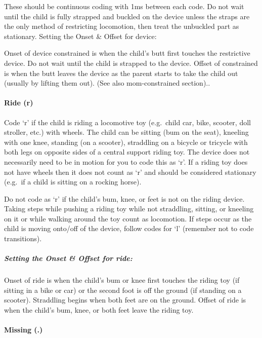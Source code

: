 \documentclass[
  12pt,
]{book}
\begin{document}
These should be continuous coding with 1ms between each code. Do not wait until the child is fully strapped and buckled on the device unless the straps are the only method of restricting locomotion, then treat the unbuckled part as stationary.
Setting the Onset \& Offset for device:

Onset of device constrained is when the child's butt first touches the restrictive device. Do not wait until the child is strapped to the device.
Offset of constrained is when the butt leaves the device as the parent starts to take the child out (usually by lifting them out). (See also mom-constrained section)..

\hypertarget{ride}{%
\paragraph*{Ride (r)}\label{ride}}

Code `r' if the child is riding a locomotive toy (e.g.~child car, bike, scooter, doll stroller, etc.) with wheels. The child can be sitting (bum on the seat), kneeling with one knee, standing (on a scooter), straddling on a bicycle or tricycle with both legs on opposite sides of a central support riding toy. The device does not necessarily need to be in motion for you to code this as `r'. If a riding toy does not have wheels then it does not count as `r' and should be considered stationary (e.g.~if a child is sitting on a rocking horse).

Do not code as `r' if the child's bum, knee, or feet is not on the riding device. Taking steps while pushing a riding toy while not straddling, sitting, or kneeling on it or while walking around the toy count as locomotion. If steps occur as the child is moving onto/off of the device, follow codes for `l' (remember not to code transitions).

\hypertarget{setting-the-onset-offset-for-ride}{%
\subparagraph*{Setting the Onset \& Offset for ride:}\label{setting-the-onset-offset-for-ride}}

Onset of ride is when the child's bum or knee first touches the riding toy (if sitting in a bike or car) or the second foot is off the ground (if standing on a scooter). Straddling begins when both feet are on the ground.
Offset of ride is when the child's bum, knee, or both feet leave the riding toy.

\hypertarget{child_missing}{%
\paragraph*{Missing (.)}\label{child_missing}}
\end{document}
